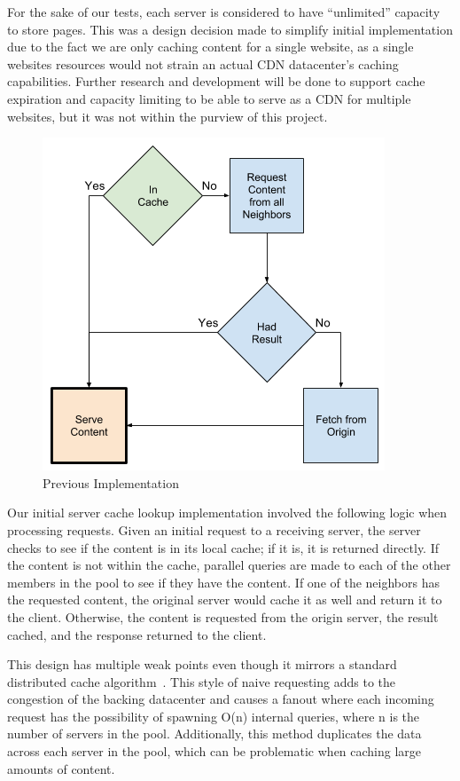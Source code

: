 \documentclass[conference]{IEEEtran}
\begin{document}
For the sake of our tests, each server is considered to have “unlimited” capacity to store pages.  This was a design decision made to simplify initial implementation due to the fact we are only caching content for a single website, as a single websites resources would not strain an actual CDN datacenter’s caching capabilities.  Further research and development will be done to support cache expiration and capacity limiting to be able to serve as a CDN for multiple websites, but it was not within the purview of this project. 

\begin{figure}[!h]
	\centering
	\includegraphics[width=0.7\columnwidth]{figures/cache_logic_before.png}
	\caption{Previous Implementation}
\end{figure}

Our initial server cache lookup implementation involved the following logic when processing requests. Given an initial request to a receiving server, the server checks to see if the content is in its local cache; if it is, it is returned directly.  If the content is not within the cache, parallel queries are made to each of the other members in the pool to see if they have the content.  If one of the neighbors has the requested content, the original server would cache it as well and return it to the client. Otherwise, the content is requested from the origin server, the result cached, and the response returned to the client. 

This design has multiple weak points even though it mirrors a standard distributed cache algorithm~\cite{mao2012cache}.  This style of naive requesting adds to the congestion of the backing datacenter and causes a fanout where each incoming request has the possibility of spawning O(n) internal queries, where n is the number of servers in the pool.  Additionally, this method duplicates the data across each server in the pool, which can be problematic when caching large amounts of content.
\end{document}
